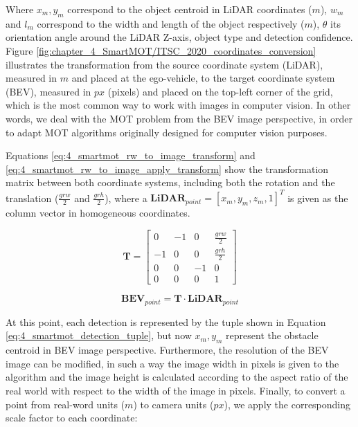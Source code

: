 Where $\textit{$x_{m},y_{m}$}$ correspond to the object centroid in LiDAR coordinates ($\textit{m}$), $\textit{$w_{m}$}$ and $\textit{$l_{m}$}$ correspond to the width and length of the object respectively ($\textit{m}$), $\theta$ its orientation angle around the LiDAR Z-axis, object type and detection confidence. Figure \ref{fig:chapter_4_SmartMOT/ITSC_2020_coordinates_conversion} illustrates the transformation from the source coordinate system (LiDAR), measured in $\textit{m}$ and placed at the ego-vehicle, to the target coordinate system (BEV), measured in $\textit{px}$ (pixels) and placed on the top-left corner of the grid, which is the most common way to work with images in computer vision. In other words, we deal with the \ac{MOT} problem from the \ac{BEV} image perspective, in order to adapt \ac{MOT} algorithms originally designed for computer vision purposes. 

Equations \ref{eq:4_smartmot_rw_to_image_transform} and \ref{eq:4_smartmot_rw_to_image_apply_transform} show the transformation matrix between both coordinate systems, including both the rotation and the translation (\textit{$\frac{grw}{2}$} and \textit{$\frac{grh}{2}$}), where a $\textbf{LiDAR}_{point}=[x_{m},y_{m},z_{m},1]^{T}$ is given as the column vector in homogeneous coordinates.

\begin{equation}
	\label{eq:4_smartmot_rw_to_image_transform}
	\textbf{T} = \left[ \begin{array}{cccc}
		0  &  -1 &  0  &  \frac{grw}{2} \\
		-1 &  0  &  0  &  \frac{grh}{2} \\
		0  &  0  &  -1 &  0            \\
		0  &  0  &  0  &  1 \end{array} \right] 
\end{equation}

\begin{equation}
	\label{eq:4_smartmot_rw_to_image_apply_transform}
	\textbf{BEV}_{point} = \textbf{T} \cdot \textbf{LiDAR}_{point}
\end{equation}

At this point, each detection is represented by the tuple shown in Equation \ref{eq:4_smartmot_detection_tuple}, but now \textit{$x_{m},y_{m}$} represent the obstacle centroid in \ac{BEV} image perspective. Furthermore, the resolution of the \ac{BEV} image can be modified, in such a way the image width in pixels is given to the algorithm and the image height is calculated according to the aspect ratio of the real world with respect to the width of the image in pixels. Finally, to convert a point from real-word units ($\textit{m}$) to camera units ($\textit{px}$), we apply the corresponding scale factor to each coordinate:

